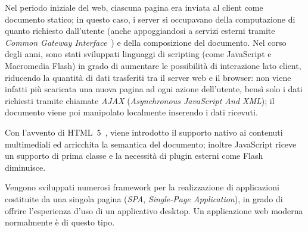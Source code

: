   Nel periodo iniziale del web, ciascuna pagina era inviata al client come documento statico;
  in questo caso, i server si occupavano della computazione di quanto richiesto dall'utente (anche appoggiandosi a servizi esterni tramite \emph{Common Gateway Interface}~\cite{Coar2004}) e della composizione del documento.
  Nel corso degli anni, sono stati sviluppati linguaggi di scripting (come JavaScript e Macromedia Flash) in grado di aumentare le possibilità di interazione lato client, riducendo la quantità di dati trasferiti tra il server web e il browser:
  non viene infatti più scaricata una nuova pagina ad ogni azione dell'utente, bensì solo i dati richiesti tramite chiamate \emph{AJAX} (\emph{Asynchronous JavaScript And XML});
  il documento viene poi manipolato localmente inserendo i dati ricevuti.

  Con l'avvento di HTML~5~\cite{Smith2008}, viene introdotto il supporto nativo ai contenuti multimediali ed arricchita la semantica del documento;
  inoltre JavaScript riceve un supporto di prima classe e la necessità di plugin esterni come Flash diminuisce.

  Vengono sviluppati numerosi framework per la realizzazione di applicazioni costituite da una singola pagina (\emph{SPA}, \emph{Single-Page Application}), in grado di offrire l'esperienza d'uso di un applicativo desktop.
  Un applicazione web moderna normalmente è di questo tipo.




